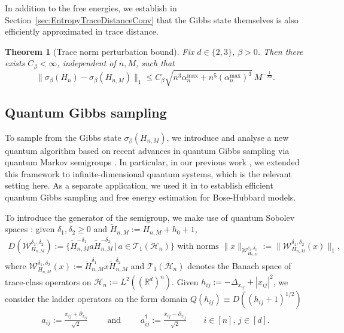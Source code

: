 \documentclass[11pt]{amsart}
\newcommand{\1}{\mathbbm{1}}
\theoremstyle{plain}
\newtheorem{theorem}{Theorem}[section]
\theoremstyle{definition}
\theoremstyle{remark}
\numberwithin{equation}{section}
\begin{document}
In addition to the free energies, we establish in Section~\ref{sec:EntropyTraceDistanceConv} that the Gibbs state themselves is also efficiently approximated in trace distance.
\begin{theorem}[Trace norm perturbation bound]
\label{thm:trace-norm-perturbation-boundIntro}
Fix \(d\in\{2,3\}\), \(\beta>0\). Then there exists \(C_\beta<\infty\), independent of \(n,M\), such that
\begin{equation}
\|\sigma_\beta(H_n)-\sigma_\beta(H_{n,M})\|_1 \le C_\beta \sqrt{n^3\alpha^{\max}_n + n^5(\alpha^{\max}_n)^3}\ M^{-\frac{1}{8d}}.
\end{equation}
\end{theorem}




\subsection{Quantum Gibbs sampling} 
To sample from the Gibbs state $\sigma_\beta(H_{n,M})$, we introduce and analyse a new quantum algorithm based on recent advances in quantum Gibbs sampling via quantum Markov semigroups \cite{RallWangWocjan2023,chen2023quantum,gilyen2024quantum,chen2023efficient,ding2025efficient,GalkowskiZworskiDavies}. In particular, in our previous work \cite{BeckerRouzeSalzmannToAppearcmp}, we extended this framework to infinite-dimensional quantum systems, which is the relevant setting here. As a separate application, we used it in \cite{BeckerRouzeSalzmannBose} to establish efficient quantum Gibbs sampling and free energy estimation for Bose-Hubbard models.

To introduce the generator of the semigroup, we make use of quantum Sobolev spaces \cite{gondolf2024energy}: given $\delta_1,\delta_2\ge 0$ and $\widetilde{H}_{n,M}:=H_{n,M}+h_0+1$,
\begin{align*}
D(\mathcal{W}_{H_{n,M}}^{\delta_1,\delta_2}):=\Big\{\widetilde{H}_{n,M}^{-\delta_1}a \widetilde{H}_{n,M}^{-\delta_2}\,\Big|\,a\in\mathscr{T}_1(\mathcal{H}_n)\Big\}\text{ with norms }
\|x\|_{\mathcal{W}_{H_{n,M}}^{\delta_1,\delta_2}}:=\|\mathcal{W}_{H_{n,M}}^{\delta_1,\delta_2}(x)\|_1,
\end{align*}
where $\mathcal{W}^{\delta_1,\delta_2}_{H_{n,M}}(x):=\widetilde{H}_{n,M}^{\delta_1} x \widetilde{H}_{n,M}^{\delta_2}$ and $\mathscr{T}_1(\mathcal{H}_n)$ denotes the Banach space of trace-class operators on $\mathcal{H}_n:=L^2((\mathbb{R}^d)^n)$. Given $h_{ij}:=-\Delta_{x_{ij}}+|x_{ij}|^2$, we consider the ladder operators on the form domain $Q(h_{ij})\equiv D((h_{ij}+1)^{1/2})$
\begin{align*}
a_{ij}:=\frac{x_{ij}+\partial_{x_{ij}}}{\sqrt{2}}\qquad \text{ and }\qquad a_{ij}^\dagger:=\frac{x_{ij}-\partial_{x_{ij}}}{\sqrt{2}}\qquad i\in[n],\,j\in[d].
\end{align*}
\end{document}
